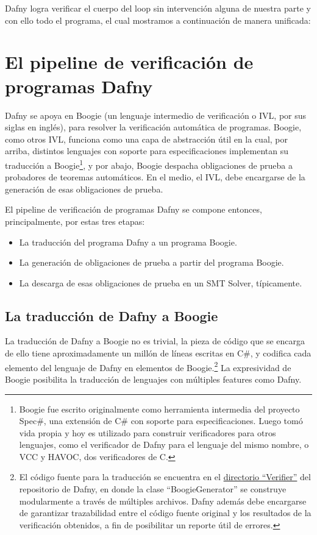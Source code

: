 \documentclass[12pt, a4paper, openany, fleqn]{book}
\begin{document}
    Dafny logra verificar el cuerpo del loop sin intervención alguna de nuestra parte y con ello todo el programa, el cual mostramos a continuación de manera unificada:

    \begin{greenbox}
    \end{greenbox}
    \chapter{El pipeline de verificación de programas Dafny} \label{ch:pipeline-dafny}

    Dafny se apoya en Boogie (un lenguaje intermedio de verificación o IVL, por sus siglas en inglés), para resolver la verificación automática de programas.
    Boogie, como otros IVL, funciona como una capa de abstracción útil en la cual, por arriba, distintos lenguajes con soporte para especificaciones implementan su traducción a Boogie\footnote{
        Boogie fue escrito originalmente como herramienta intermedia del proyecto Spec\#, una extensión de C\# con soporte para especificaciones. Luego tomó vida propia y hoy es utilizado para construir verificadores para otros lenguajes, como el verificador de Dafny para el lenguaje del mismo nombre, o VCC y HAVOC, dos verificadores de C.
    }, y por abajo, Boogie despacha obligaciones de prueba a probadores de teoremas automáticos. En el medio, el IVL, debe encargarse de la generación de esas obligaciones de prueba.

    El pipeline de verificación de programas Dafny se compone entonces, principalmente, por estas tres etapas:
    \begin{itemize}
        \item La traducción del programa Dafny a un programa Boogie.
        \item La generación de obligaciones de prueba a partir del programa Boogie.
        \item La descarga de esas obligaciones de prueba en un SMT Solver, típicamente.
    \end{itemize}

    \section{La traducción de Dafny a Boogie}
    La traducción de Dafny a Boogie no es trivial, la pieza de código que se encarga de ello tiene aproximadamente un millón de líneas escritas en C\#, y codifica cada elemento del lenguaje de Dafny en elementos de Boogie.\footnote{El código fuente para la traducción se encuentra en el \href{https://github.com/dafny-lang/dafny/tree/v4.7.0/Source/DafnyCore/Verifier}{directorio ``Verifier''} del repositorio de Dafny, en donde la clase ``BoogieGenerator'' se construye modularmente a través de múltiples archivos. Dafny además debe encargarse de garantizar trazabilidad entre el código fuente original y los resultados de la verificación obtenidos, a fin de posibilitar un reporte útil de errores.} La expresividad de Boogie posibilita la traducción de lenguajes con múltiples features como Dafny.
\end{document}
